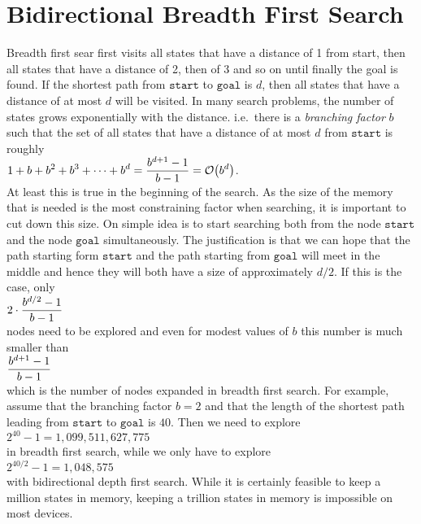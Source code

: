 \section{Bidirectional Breadth First Search}
Breadth first sear first visits all states that have a distance of 1 from start, then all
states that have a distance of 2, then of 3 and so on until finally the goal is found.  If the shortest path
from $\mathtt{start}$ to $\mathtt{goal}$ is $d$, then all states that have a distance of at most $d$ will be
visited.  In many search problems, the number of states grows exponentially with the distance. i.e.~there is
a \emph{\color{blue}branching factor} $b$ such that the set of all states that have a distance of at most $d$
from $\mathtt{start}$ is roughly
\\[0.2cm]
\hspace*{1.3cm}
 $\displaystyle 1 + b + b^2 + b^3 + \cdots + b^d = \frac{b^{d+1} - 1}{b - 1} = \mathcal{O}\bigl(b^d\bigr)$. 
\\[0.2cm]
At least this is true in the beginning of the search.  As the size of
the memory that is needed is the most constraining factor when searching, it is important to cut down this
size.  On simple idea is to start searching both from the node $\mathtt{start}$ and the node $\mathtt{goal}$
simultaneously.  The justification is that we can hope that the path starting form $\mathtt{start}$ and the
path starting from $\mathtt{goal}$ will meet in the middle and hence they will both have a size of approximately
$d/2$.  If this is the case, only
\\[0.2cm]
\hspace*{1.3cm}
$\displaystyle 2 \cdot \frac{b^{d/2} - 1}{b - 1}$ 
\\[0.2cm]
nodes need to be explored and even for modest values of $b$ this number is much smaller than 
\\[0.2cm]
\hspace*{1.3cm}
$\displaystyle\frac{b^{d+1} - 1}{b - 1}$
\\[0.2cm]
which is the number of nodes expanded in breadth first search.  For example, assume that the branching factor
$b = 2$ and that the length of the shortest path leading from $\mathtt{start}$ to $\mathtt{goal}$
is $40$.  Then we need to explore
\\[0.2cm]
\hspace*{1.3cm}
$2^{40} - 1 = 1,099,511,627,775$
\\[0.2cm]
in breadth first search, while we only have to explore 
\\[0.2cm]
\hspace*{1.3cm}
$2^{40/2} - 1 = 1,048,575$
\\[0.2cm]
with bidirectional depth first search.  While it is certainly feasible to keep a million states in memory,
keeping a trillion states in memory is impossible on most devices.


